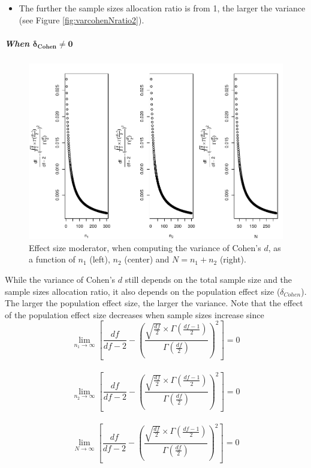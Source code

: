 \documentclass[
  english,
  man,mask]{apa6}
\providecommand{\tightlist}{%
  \setlength{\itemsep}{0pt}\setlength{\parskip}{0pt}}
\let\oldsubparagraph\subparagraph
\renewcommand{\subparagraph}[1]{\oldsubparagraph{#1}\mbox{}}
\begin{document}
\begin{itemize}
\tightlist
\item
  The further the sample sizes allocation ratio is from 1, the larger the variance (see Figure \ref{fig:varcohenNratio2}).
\end{itemize}

\hypertarget{when-bmdelta_cohenneq-0}{%
\subparagraph{\texorpdfstring{When \(\bm{\delta_{Cohen}\neq 0}\)}{When \textbackslash bm\{\textbackslash delta\_\{Cohen\}\textbackslash neq 0\}}}\label{when-bmdelta_cohenneq-0}}

\begin{figure}
\centering
\includegraphics{SupMat1_files/figure-latex/ESmoderatorcohenNsize2-1.pdf}
\caption{\label{fig:ESmoderatorcohenNsize2}Effect size moderator, when computing the variance of Cohen's \(d\), as a function of \(n_1\) (left), \(n_2\) (center) and \(N=n_1+n_2\) (right).}
\end{figure}

While the variance of Cohen's \(d\) still depends on the total sample size and the sample sizes allocation ratio, it also depends on the population effect size (\(\delta_{Cohen}\)). The larger the population effect size, the larger the variance. Note that the effect of the population effect size decreases when sample sizes increase since
\[\lim_{n_1\rightarrow \infty}\left[\frac{df}{df-2} - \left( \frac{\sqrt{\frac{df}{2}} \times \Gamma \left(\frac{df-1}{2} \right)}{\Gamma \left( \frac{df}{2}\right)}\right)^2 \right]=0\]\\
\[\lim_{n_2\rightarrow \infty}\left[\frac{df}{df-2} - \left( \frac{\sqrt{\frac{df}{2}} \times \Gamma \left(\frac{df-1}{2} \right)}{\Gamma \left( \frac{df}{2}\right)}\right)^2 \right]=0\]\\
\[\lim_{N\rightarrow \infty}\left[\frac{df}{df-2} - \left( \frac{\sqrt{\frac{df}{2}} \times \Gamma \left(\frac{df-1}{2} \right)}{\Gamma \left( \frac{df}{2}\right)}\right)^2 \right]=0\]
\end{document}
